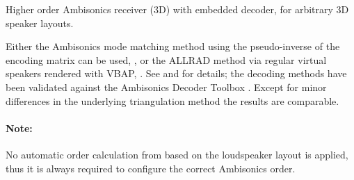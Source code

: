 Higher order Ambisonics receiver (3D) with embedded decoder, for
arbitrary 3D speaker layouts.



Either the Ambisonics mode matching method using the pseudo-inverse of
the encoding matrix can be used, , or the ALLRAD
method via regular virtual speakers rendered with VBAP,
. See \citet{Daniel2001} and
\citet{Heller2012,Heller2014} for details; the decoding methods have
been validated against the Ambisonics Decoder Toolbox
\citep{Heller2014}. Except for minor differences in the underlying
triangulation method the results are comparable.


\paragraph{Note:}
No automatic order calculation from based on the loudspeaker layout is
applied, thus it is always required to configure the correct
Ambisonics order.
